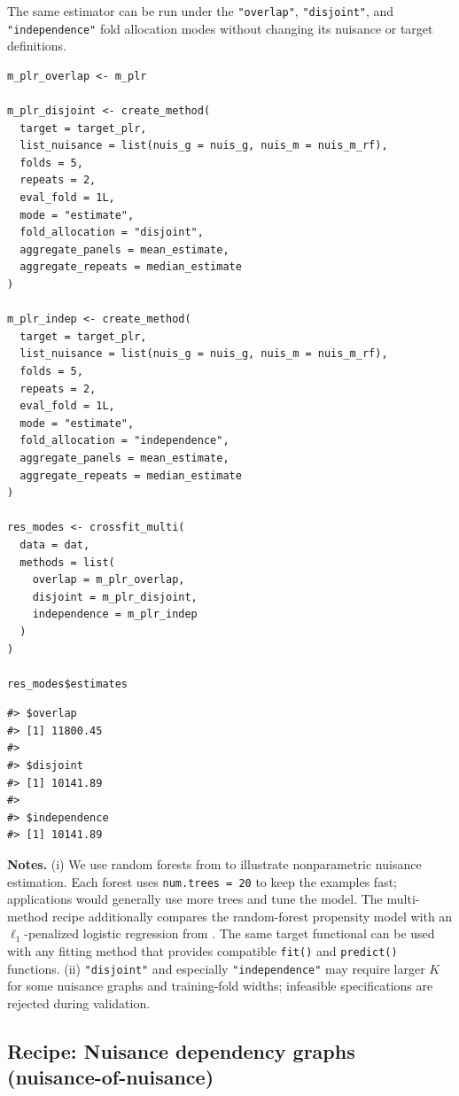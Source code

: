 The same estimator can be run under the \texttt{"overlap"}, \texttt{"disjoint"}, and \texttt{"independence"} fold allocation modes without changing its nuisance or target definitions.

\begin{verbatim}
m_plr_overlap <- m_plr

m_plr_disjoint <- create_method(
  target = target_plr,
  list_nuisance = list(nuis_g = nuis_g, nuis_m = nuis_m_rf),
  folds = 5,
  repeats = 2,
  eval_fold = 1L,
  mode = "estimate",
  fold_allocation = "disjoint",
  aggregate_panels = mean_estimate,
  aggregate_repeats = median_estimate
)

m_plr_indep <- create_method(
  target = target_plr,
  list_nuisance = list(nuis_g = nuis_g, nuis_m = nuis_m_rf),
  folds = 5,
  repeats = 2,
  eval_fold = 1L,
  mode = "estimate",
  fold_allocation = "independence",
  aggregate_panels = mean_estimate,
  aggregate_repeats = median_estimate
)

res_modes <- crossfit_multi(
  data = dat,
  methods = list(
    overlap = m_plr_overlap,
    disjoint = m_plr_disjoint,
    independence = m_plr_indep
  )
)

res_modes$estimates
\end{verbatim}

\begin{verbatim}
#> $overlap
#> [1] 11800.45
#> 
#> $disjoint
#> [1] 10141.89
#> 
#> $independence
#> [1] 10141.89
\end{verbatim}

\textbf{Notes.} (i) We use random forests from  to illustrate nonparametric nuisance estimation. Each forest uses \texttt{num.trees\ =\ 20} to keep the examples fast; applications would generally use more trees and tune the model. The multi-method recipe additionally compares the random-forest propensity model with an \(\ell_1\)-penalized logistic regression from . The same target functional can be used with any fitting method that provides compatible \texttt{fit()} and \texttt{predict()} functions. (ii) \texttt{"disjoint"} and especially \texttt{"independence"} may require larger \(K\) for some nuisance graphs and training-fold widths; infeasible specifications are rejected during validation.

\subsection{Recipe: Nuisance dependency graphs (nuisance-of-nuisance)}\label{app:dag}

